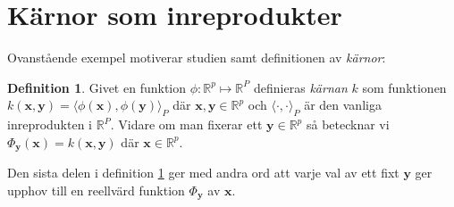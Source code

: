 \documentclass[a4paper, 12pt]{report}
\theoremstyle{definition}
\newtheorem{defi}{Definition}[section]
\theoremstyle{remark}
\newcommand{\bfx}{\mathbf{x}}
\newcommand{\bfy}{\mathbf{y}}
\begin{document}



\section{Kärnor som inreprodukter}

Ovanstående exempel motiverar studien samt definitionen av \emph{kärnor}:
\begin{defi}\label{def:kärna}
	Givet en funktion $\phi: \mathbb{R}^p \longmapsto \mathbb{R}^P$ definieras \emph{kärnan} $k$ som funktionen $k\left(\bfx, \bfy\right) = \langle \phi \left(\bfx\right), \phi\left(\bfy\right) \rangle_P$ där $\bfx, \bfy \in \mathbb{R}^p$ och $\langle \cdot, \cdot \rangle_P$ är den vanliga inreprodukten i $\mathbb{R}^P$.
	Vidare om man fixerar ett $\bfy\in\mathbb{R}^p$ så betecknar vi $\Phi_{\bfy}\left(\bfx\right) = k\left(\bfx, \bfy\right)$ där $\bfx\in\mathbb{R}^p$.
\end{defi}
Den sista delen i definition \ref{def:kärna} ger med andra ord att varje val av ett fixt $\bfy$ ger upphov till en reellvärd funktion $\Phi_{\bfy}$ av $\bfx$.
\end{document}
